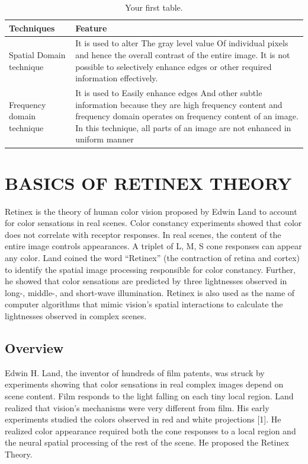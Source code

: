 \begin{table}[h!]
	\begin{center}
	\caption{Your first table.}
    \label{tab:table1}
	\begin{tabular}{| m{5cm} | m{8cm}| }
	\hline
		\textbf{Techniques} & \textbf{Feature}\\
	\hline
		Spatial Domain technique & It is used to alter The gray level value Of individual pixels and hence the overall contrast of the entire image. It is not possible to selectively enhance edges or other required information effectively. \\
	\hline
		Frequency domain technique & It is used to Easily enhance edges And other subtle information because they are high frequency content and frequency domain operates on frequency content of an image. In this technique, all parts of  an  image  are  not enhanced in uniform manner \\ 
	
	\hline
	\end{tabular}
	\end{center}

\end{table}


\section{BASICS OF RETINEX THEORY}
Retinex is the theory of human color vision proposed by Edwin Land to account for color sensations in real scenes. Color constancy experiments showed that color does not correlate with receptor responses. In real scenes, the content of the entire image controls appearances. A triplet of L, M, S cone responses can appear any color. Land coined the word “Retinex” (the contraction of retina and cortex) to identify the spatial image processing responsible for color constancy. Further, he showed that color sensations are predicted by three lightnesses observed in long-, middle-, and short-wave illumination. Retinex is also used as the name of computer algorithms that mimic vision’s spatial interactions to calculate the lightnesses observed in complex scenes.

\subsection{Overview}
Edwin H. Land, the inventor of hundreds of film patents, was struck by experiments showing that color sensations in real complex images depend on scene content. Film responds to the light falling on each tiny local region. Land realized that vision’s mechanisms were very different from film. His early experiments studied the colors observed in red and white projections [1]. He realized color appearance required both the cone responses to a local region and the neural spatial processing of the rest of the scene. He proposed the Retinex Theory.

